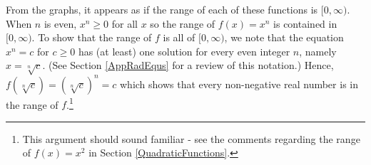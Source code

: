 \documentclass{ximera}
\begin{document}
\begin{center} 
\end{center}













From the graphs, it appears as if the range of each of these functions is $[0, \infty)$.  When $n$ is even, $x^n \geq 0$ for all $x$ so the range of $f(x) = x^{n}$ is contained in $[0, \infty)$.  To show that the range of $f$ is all of $[0, \infty)$, we note that the equation $x^n  = c$ for $c \geq 0$ has (at least) one solution for every even integer $n$, namely  $x = \sqrt[n]{c}$. (See Section \ref{AppRadEqus} for a review of this notation.)  Hence, $f(\sqrt[n]{c}) = (\sqrt[n]{c})^n = c$ which shows that every non-negative real number is in the range of $f$.\footnote{This argument should sound familiar - see the comments regarding the range of $f(x) = x^2$ in Section \ref{QuadraticFunctions}.}
\end{document}
